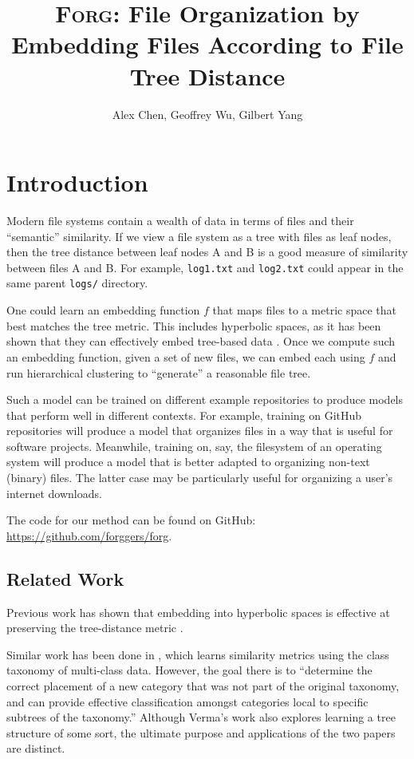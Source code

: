 \documentclass{article}
\title{\textsc{Forg}: File Organization by Embedding Files According to File Tree Distance}
\author{Alex Chen, Geoffrey Wu, Gilbert Yang}
\begin{document}
\maketitle

\section{Introduction}

Modern file systems contain a wealth of data in terms of files and their ``semantic'' similarity. If we view a file system as a tree with files as leaf nodes, then the tree distance between leaf nodes A and B is a good measure of similarity between files A and B. For example, \texttt{log1.txt} and \texttt{log2.txt} could appear in the same parent \texttt{logs/} directory.

One could learn an embedding function $f$ that maps files to a metric space that best matches the tree metric. This includes hyperbolic spaces, as it has been shown that they can effectively embed tree-based data \cite{sarkar2011low} \cite{sala2018representation}. Once we compute such an embedding function, given a set of new files, we can embed each using $f$ and run hierarchical clustering \cite{murtagh2012algorithms} to “generate” a reasonable file tree.

Such a model can be trained on different example repositories to produce models that perform well in different contexts. For example, training on GitHub repositories will produce a model that organizes files in a way that is useful for software projects. Meanwhile, training on, say, the filesystem of an operating system will produce a model that is better adapted to organizing non-text (binary) files. The latter case may be particularly useful for organizing a user's internet downloads.

The code for our method can be found on GitHub: \url{https://github.com/forggers/forg}.

\subsection{Related Work}

Previous work has shown that embedding into hyperbolic spaces is effective at preserving the tree-distance metric \cite{sarkar2011low} \cite{sala2018representation}.

Similar work has been done in \cite{verma2012learning}, which learns similarity metrics using the class taxonomy of multi-class data. However, the goal there is to ``determine the correct placement of a new category that was not part of the original taxonomy, and can provide effective classification amongst categories local to specific subtrees of the taxonomy.'' Although Verma's work also explores learning a tree structure of some sort, the ultimate purpose and applications of the two papers are distinct.
\end{document}
